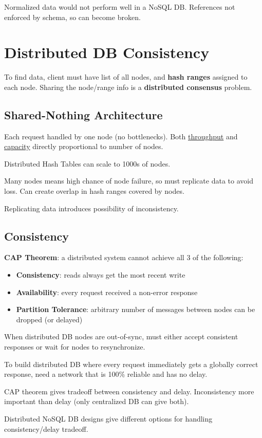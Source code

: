 \documentclass[11pt]{article}
\begin{document}
Normalized data would not perform well in a NoSQL DB.
References not enforced by schema, so can become broken.
\section{Distributed DB Consistency}
\label{sec:orgaf4d2c5}
To find data, client must have list of all nodes, and \textbf{hash ranges} assigned to each node.
Sharing the node/range info is a \textbf{distributed consensus} problem.
\subsection{Shared-Nothing Architecture}
\label{sec:org245f90f}
Each request handled by one node (no bottlenecks).
Both \uline{throughput} and \uline{capacity} directly proportional to number of nodes.

Distributed Hash Tables can scale to 1000s of nodes.

Many nodes means high chance of node failure, so must replicate data to avoid loss.
Can create overlap in hash ranges covered by nodes.

Replicating data introduces possibility of inconsistency.
\subsection{Consistency}
\label{sec:orgc6a3ea4}
\textbf{CAP Theorem}: a distributed system cannot achieve all 3 of the following:
\begin{itemize}
\item \textbf{Consistency}: reads always get the most recent write
\item \textbf{Availability}: every request received a non-error response
\item \textbf{Partition Tolerance}: arbitrary number of messages between nodes can be dropped (or delayed)
\end{itemize}

When distributed DB nodes are out-of-sync, must either accept consistent responses or wait for nodes
to resynchronize.

To build distributed DB where every request immediately gets a globally correct response, need a network
that is 100\% reliable and has no delay.

CAP theorem gives tradeoff between consistency and delay.
Inconsistency more important than delay (only centralized DB can give both).

Distributed NoSQL DB designs give different options for handling consistency/delay tradeoff.
\end{document}
